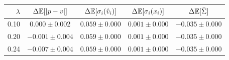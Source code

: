 \begin{tabular}{rcccc}
\hline
$\lambda$ & $\Delta\mathbb{E}[|p-v|]$ & $\Delta\mathbb{E}[\sigma_i(\hat v_i)]$ & $\Delta\mathbb{E}[\sigma_i(x_i)]$ & $\Delta\mathbb{E}[\bar\Sigma]$ \\
\hline
0.10 & $0.000\pm0.002$ & $0.059\pm0.000$ & $0.001\pm0.000$ & $-0.035\pm0.000$ \\
0.20 & $-0.001\pm0.004$ & $0.059\pm0.000$ & $0.001\pm0.000$ & $-0.035\pm0.000$ \\
0.24 & $-0.007\pm0.004$ & $0.059\pm0.000$ & $0.001\pm0.000$ & $-0.035\pm0.000$ \\
\hline
\end{tabular}
